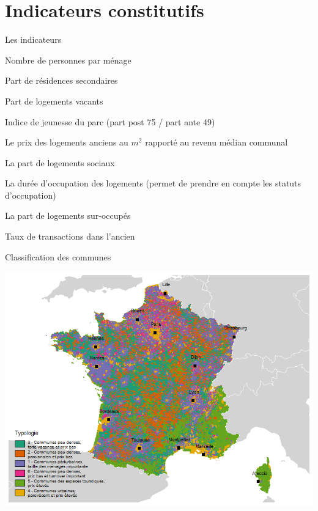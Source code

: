 \documentclass[11pt]{beamer}
\begin{document}
\section{ Indicateurs constitutifs}

\begin{frame}{Les indicateurs}

\begin{enumerate}
\small{
\item Nombre de personnes par ménage
\item Part de résidences secondaires
\item Part de logements vacants
\item Indice de jeunesse du parc (part post 75 / part ante 49)
\item Le prix des logements anciens au $m^2$  rapporté au revenu médian communal
\item La part de logements sociaux
\item La durée d'occupation des logements (permet de prendre en compte les statuts d'occupation)
\item La part de logements sur-occupés
\item Taux de transactions dans l'ancien
}
\end{enumerate}
\end{frame}

\begin{frame}{Classification des communes}
\begin{center}
\includegraphics[scale=.5]{img/Typo_com}
\end{center}
\end{frame}
\end{document}
